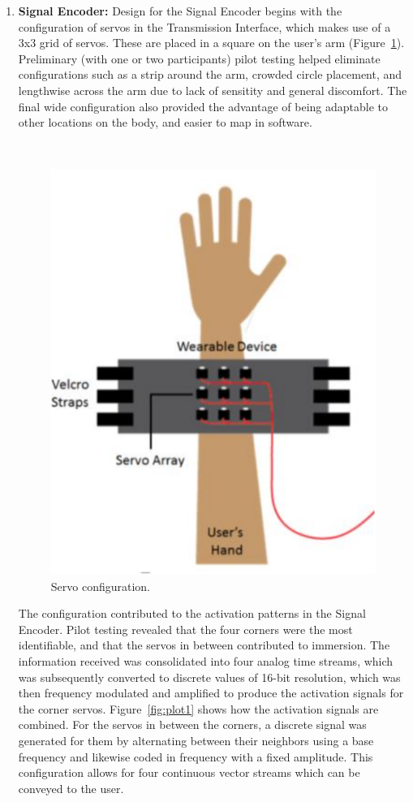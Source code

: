\documentclass[
hidelinks,
12pt, %
oneside, %
english, %
doublespacing, %
headsepline, %
]{MastersDoctoralThesis} %
\begin{document}
\begin{enumerate}
\item \textbf{Signal Encoder:} Design for the Signal Encoder begins with the configuration of servos in the Transmission Interface, which makes use of a 3x3 grid of servos. These are placed in a square on the user's arm (Figure~\ref{fig:device2}). Preliminary (with one or two participants) pilot testing helped eliminate configurations such as a strip around the arm, crowded circle placement, and lengthwise across the arm due to lack of sensitity and general discomfort. The final wide configuration also provided the advantage of being adaptable to other locations on the body, and easier to map in software.

\,
\begin{figure}[ht]
\centering\includegraphics[width=0.4\linewidth]{images/v1device2.png}
\decoRule
\caption[Servo configuration]{Servo configuration.}
\label{fig:device2}
\end{figure}

The configuration contributed to the activation patterns in the Signal Encoder. Pilot testing revealed that the four corners were the most identifiable, and that the servos in between contributed to immersion.
The information received was consolidated into four analog time streams, which was subsequently converted to discrete values of 16-bit resolution, which was then frequency modulated \parencite{noauthor_frequency_2017} and amplified to produce the activation signals for the corner servos. Figure~\ref{fig:plot1} shows how the activation signals are combined. For the servos in between the corners, a discrete signal was generated for them by alternating between their neighbors using a base frequency and likewise coded in frequency with a fixed amplitude. This configuration allows for four continuous vector streams which can be conveyed to the user.

\,


\end{enumerate}
\end{document}
